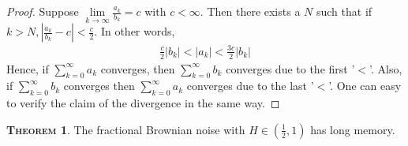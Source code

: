 \documentclass[a4paper, twoside, 11pt]{article}
\theoremstyle{definition}
\newtheorem{theorem}[definition]{\scshape Theorem}
\begin{document}
\begin{proof}
  Suppose $\lim\limits_{k\rightarrow \infty}\frac{a_k}{b_k}=c$ with $c<\infty$. Then there exists a $N$ such that if $k > N, |\frac{a_k}{b_k} - c| < \frac{c}{2}$. In other words, 
  \begin{eqnarray*}
	\frac{c}{2}|b_k| < |a_k| < \frac{3c}{2}|b_k|
  \end{eqnarray*}
  Hence, if $\sum_{k=0}^{\infty} a_k$ converges, then $\sum_{k=0}^{\infty} b_k$ converges due to the first '$<$'. Also, if $\sum_{k=0}^{\infty} b_k$ converges then $\sum_{k=0}^{\infty} a_k$ converges due to the last '$<$'. One can easy to verify the claim of the divergence in the same way.
\end{proof}
\begin{theorem}
  The fractional Brownian noise with $H \in (\frac{1}{2}, 1)$ has long memory.
  \label{sec:lmemory}
\end{theorem}
\end{document}

